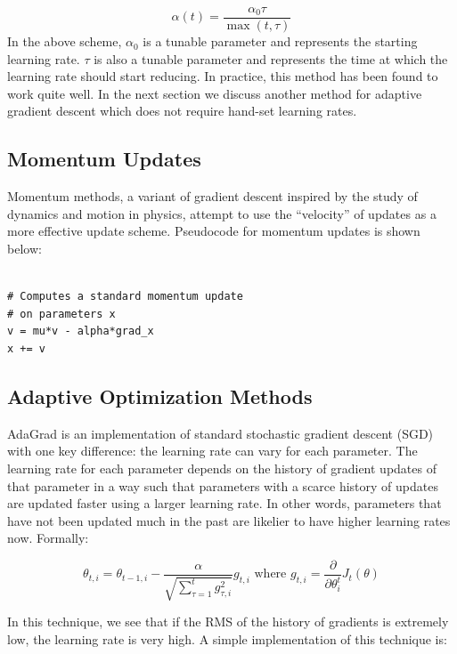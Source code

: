 \documentclass{tufte-handout}
\begin{document}
{$$ \alpha(t) = \frac{\alpha_0\tau}{\max(t, \tau)}$$
In the above scheme, $\alpha_0$ is a tunable parameter and represents the starting learning rate. $\tau$ is also a tunable parameter and represents the time at which the learning rate should start reducing. In practice, this method has been found to work quite well. In the next section we discuss another method for adaptive gradient descent which does not require hand-set learning rates.


\subsection{Momentum Updates}

Momentum methods, a variant of gradient descent inspired by the study of dynamics and motion in physics, attempt to use the ``velocity'' of updates as a more effective update scheme. Pseudocode for momentum updates is shown below:

\begin{theorem}
\begin{verbatim}

# Computes a standard momentum update
# on parameters x
v = mu*v - alpha*grad_x
x += v
\end{verbatim}
\label{snip:momentup}
\end{theorem}


\subsection{Adaptive Optimization Methods}

AdaGrad is an implementation of standard stochastic gradient descent (SGD) with one key difference: the learning rate can vary for each parameter. The learning rate for each parameter depends on the history of gradient updates of that parameter in a way such that parameters with a scarce history of updates are updated faster using a larger learning rate. In other words, parameters that have not been updated much in the past are likelier to have higher learning rates now. Formally:

$$\theta_{t,i} = \theta_{t-1,i}  - \frac{\alpha}{\sqrt{\sum_{\tau=1}^{t} g_{\tau , i}^2}} g_{t,i} \text{ where } g_{t,i} = \frac{\partial}{\partial \theta_i^t}J_t(\theta) $$

In this technique, we see that if the RMS of the history of gradients is extremely low, the learning rate is very high. A simple implementation of this technique is:
\begin{theorem}
\begin{verbatim}


\end{verbatim}
\end{theorem}}
\end{document}
